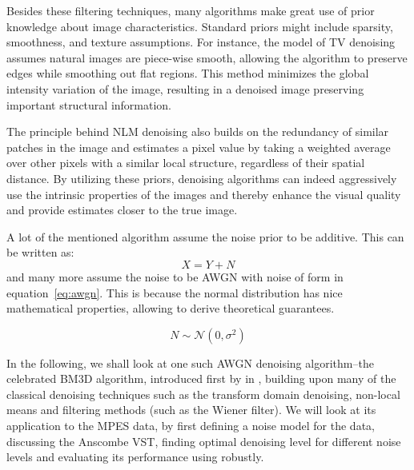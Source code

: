 Besides these filtering techniques, many algorithms make great use of prior knowledge about image characteristics. Standard priors might include sparsity, smoothness, and texture assumptions. For instance, the model of TV denoising assumes natural images are piece-wise smooth, allowing the algorithm to preserve edges while smoothing out flat regions. This method minimizes the global intensity variation of the image, resulting in a denoised image preserving important structural information.

The principle behind \gls{NLM} denoising also builds on the redundancy of similar patches in the image and estimates a pixel value by taking a weighted average over other pixels with a similar local structure, regardless of their spatial distance. By utilizing these priors, denoising algorithms can indeed aggressively use the intrinsic properties of the images and thereby enhance the visual quality and provide estimates closer to the true image.

A lot of the mentioned algorithm assume the noise prior to be additive. This can be written as:
\begin{equation}
    X = Y + N
\end{equation}
and many more assume the noise to be \gls{AWGN} with noise of form in equation~\ref{eq:awgn}. This is because the normal distribution has nice mathematical properties, allowing to derive theoretical guarantees.

\begin{equation}\label{eq:awgn}
    N \sim \mathcal{N}(0, \sigma^2)
\end{equation}

In the following, we shall look at one such \gls{AWGN} denoising algorithm--the celebrated \gls{BM3D} algorithm, introduced first by \citeauthor{dabovImageDenoisingSparse2007} in \cite{dabovImageDenoisingSparse2007}, building upon many of the classical denoising techniques such as the transform domain denoising, non-local means and filtering methods (such as the Wiener filter). We will look at its application to the \gls{MPES} data, by first defining a noise model for the data, discussing the Anscombe \gls{VST}, finding optimal denoising level for different noise levels and evaluating its performance using robustly.

